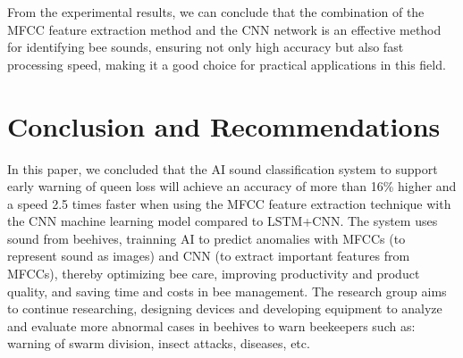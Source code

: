 \documentclass[twocolumn]{article}
\begin{document}
From the experimental results, we can conclude that the combination of the MFCC feature
extraction method and the CNN network is an effective method for identifying bee sounds,
ensuring not only high accuracy but also fast processing speed, making it a good choice
for practical applications in this field.

\section{Conclusion and Recommendations}
In this paper, we concluded that the AI sound classification system to support early 
warning of queen loss will achieve an accuracy of more than 16\% higher and a speed 
2.5 times faster when using the MFCC feature extraction technique with the CNN machine 
learning model compared to LSTM+CNN. The system uses  sound from beehives, trainning AI 
to predict anomalies with MFCCs (to represent sound as images) and CNN 
(to extract important features from MFCCs), thereby optimizing bee care, improving 
productivity and product quality, and saving time and costs in bee management. The 
research group aims to continue researching, designing devices and developing equipment 
to analyze and evaluate more abnormal cases in beehives to warn beekeepers such as: 
warning of swarm division, insect attacks, diseases, etc.


\printbibliography
\end{document}
